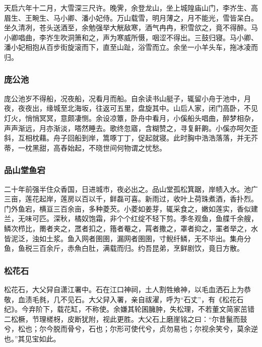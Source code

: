 \documentclass[]{article}
\begin{document}
天启六年十二月，大雪深三尺许。晚霁，余登龙山，坐上城隍庙山门，李岕生、高眉生、王畹生、马小卿、潘小妃侍。万山载雪，明月薄之，月不能光，雪皆呆白。坐久清冽，苍头送酒至，余勉强举大觥敌寒，酒气冉冉，积雪欱之，竟不得醉。马小卿唱曲，李岕生吹洞箫和之，声为寒威所慑，咽涩不得出。三鼓归寝。马小卿、潘小妃相抱从百步街旋滚而下，直至山趾，浴雪而立。余坐一小羊头车，拖冰凌而归。

\hypertarget{header-n555}{%
\subsubsection{庞公池}\label{header-n555}}

庞公池岁不得船，况夜船，况看月而船。自余读书山艇子，辄留小舟于池中，月夜，夜夜出，缘城至北海坂，往返可五里，盘旋其中。山后人家，闭门高卧，不见灯火，悄悄冥冥，意颇凄恻。余设凉簟，卧舟中看月，小傒船头唱曲，醉梦相杂，声声渐远，月亦渐淡，嗒然睡去。歌终忽寤，含糊赞之，寻复鼾齁。小傒亦呵欠歪斜，互相枕藉。舟子回船到岸，篙啄丁丁，促起就寝。此时胸中浩浩落落，并无芥蒂，一枕黑甜，高舂始起，不晓世间何物谓之忧愁。

\hypertarget{header-n560}{%
\subsubsection{品山堂鱼宕}\label{header-n560}}

二十年前强半住众香国，日进城市，夜必出之。品山堂孤松箕踞，岸帻入水。池广三亩，莲花起岸，莲房以百以千，鲜磊可喜。新雨过，收叶上荷珠煮酒，香扑烈。门外鱼宕，横亘三百余亩，多种菱芡。小菱如姜芽，辄采食之，嫩如莲实，香似建兰，无味可匹。深秋，橘奴饱霜，非个个红绽不轻下剪。季冬观鱼，鱼艓千余艘，鳞次栉比，罱者夹之，罛者扣之，簎者罨之，罥者撒之，罩者抑之，罣者举之，水皆泥泛，浊如土浆。鱼入网者圉圉，漏网者圉圉，寸鲵纤鳞，无不毕出。集舟分鱼，鱼税三百余斤，赤魚白肚，满载而归。约吾昆弟，烹鲜剧饮，竟日方散。

\hypertarget{header-n565}{%
\subsubsection{松花石}\label{header-n565}}

松花石，大父舁自潇江署中。石在江口神祠，土人割牲飨神，以毛血洒石上为恭敬，血渍毛毵，几不见石。大父舁入署，亲自祓濯，呼为``石丈''，有《松花石纪》。今弃阶下，载花缸，不称使。余嫌其轮囷臃肿，失松理，不若董文简家茁错二松橛，节理槎枒，皮断犹附，视此更胜。大父石上磨崖铭之曰：``尔昔鬣而鼓兮，松也；尔今脱而骨兮，石也；尔形可使代兮，贞勿易也；尔视余笑兮，莫余逆也。''其见宝如此。
\end{document}
